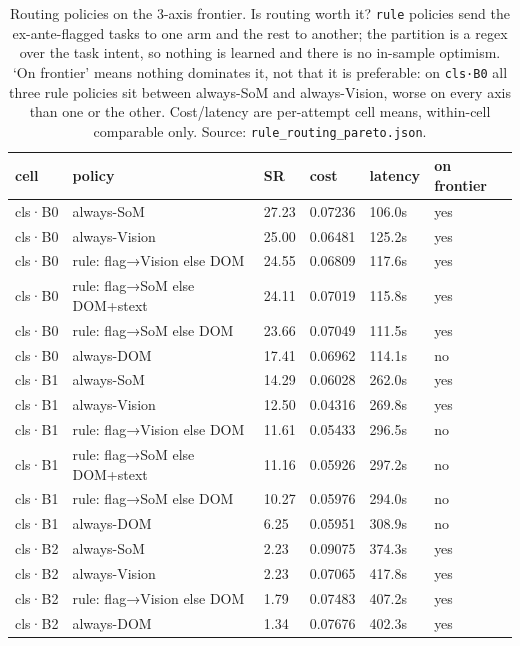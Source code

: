 \begin{table}[tp]
\centering
\caption{Routing policies on the 3-axis frontier. Is routing worth it? \texttt{rule} policies send the ex-ante-flagged tasks to one arm and the rest to another; the partition is a regex over the task intent, so nothing is learned and there is no in-sample optimism. `On frontier' means nothing dominates it, not that it is preferable: on \texttt{cls·B0} all three rule policies sit between always-SoM and always-Vision, worse on every axis than one or the other. Cost/latency are per-attempt cell means, within-cell comparable only. Source: \texttt{rule\_routing\_pareto.json}.}
\label{tab:t19}
\footnotesize
\setlength{\tabcolsep}{3pt}
\begin{tabular}{@{}llllll@{}}
\toprule
cell & policy & SR & cost & latency & on frontier \\
\midrule
cls·B0 & always-SoM & 27.23 & 0.07236 & 106.0s & yes \\
cls·B0 & always-Vision & 25.00 & 0.06481 & 125.2s & yes \\
cls·B0 & rule: flag→Vision else DOM & 24.55 & 0.06809 & 117.6s & yes \\
cls·B0 & rule: flag→SoM else DOM+\allowbreak{}stext & 24.11 & 0.07019 & 115.8s & yes \\
cls·B0 & rule: flag→SoM else DOM & 23.66 & 0.07049 & 111.5s & yes \\
cls·B0 & always-DOM & 17.41 & 0.06962 & 114.1s & no \\
cls·B1 & always-SoM & 14.29 & 0.06028 & 262.0s & yes \\
cls·B1 & always-Vision & 12.50 & 0.04316 & 269.8s & yes \\
cls·B1 & rule: flag→Vision else DOM & 11.61 & 0.05433 & 296.5s & no \\
cls·B1 & rule: flag→SoM else DOM+\allowbreak{}stext & 11.16 & 0.05926 & 297.2s & no \\
cls·B1 & rule: flag→SoM else DOM & 10.27 & 0.05976 & 294.0s & no \\
cls·B1 & always-DOM & 6.25 & 0.05951 & 308.9s & no \\
cls·B2 & always-SoM & 2.23 & 0.09075 & 374.3s & yes \\
cls·B2 & always-Vision & 2.23 & 0.07065 & 417.8s & yes \\
cls·B2 & rule: flag→Vision else DOM & 1.79 & 0.07483 & 407.2s & yes \\
cls·B2 & always-DOM & 1.34 & 0.07676 & 402.3s & yes \\

\end{tabular}
\end{table}
